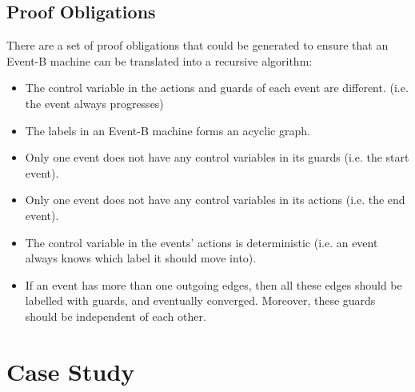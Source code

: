 \documentclass{easychair}
\begin{document}
\subsection{Proof Obligations}
There are a set of proof obligations that could be generated to ensure that an Event-B machine can be translated into a recursive algorithm:
\begin{itemize}
	\item The control variable in the actions and guards of each event are different. (i.e. the event always progresses)
	\item The labels in an Event-B machine forms an acyclic graph.
	\item Only one event does not have any control variables in its guards (i.e. the start event).
	\item Only one event does not have any control variables in its actions (i.e. the end event).
	\item The control variable in the events' actions is deterministic (i.e. an event always knows which label it should move into).
	\item If an event has more than one outgoing edges, then all these edges should be labelled with guards, and eventually converged. Moreover, these guards should be independent of each other.
	
\end{itemize}





\newpage
\section{Case Study}\label{sect:result}
\end{document}
